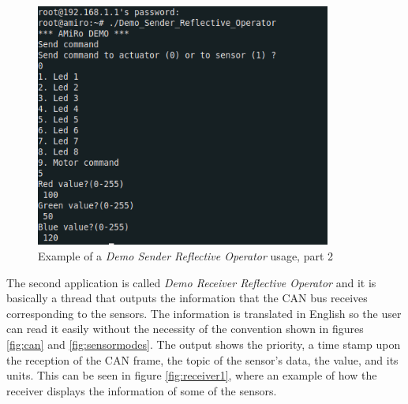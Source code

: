 \documentclass[12pt]{report}%
\begin{document}
\begin{figure}[h]
 \centering
 \includegraphics[width=\textwidth, height=8cm]{sender_example2}
		\caption{Example of a \textit{Demo Sender Reflective Operator} usage, part 2}
		\label{fig:sender2}
\end{figure}

The second application is called \textit{Demo Receiver Reflective Operator} and it is basically a thread that outputs the information that the CAN bus receives corresponding to the sensors. The information is translated in English so the user can read it easily without the necessity of the convention shown in figures \ref{fig:can} and \ref{fig:sensormodes}. The output shows the priority, a time stamp upon the reception of the CAN frame, the topic of the sensor's data, the value, and its units. This can be seen in figure \ref{fig:receiver1}, where an example of how the receiver displays the information of some of the sensors.
\end{document}
